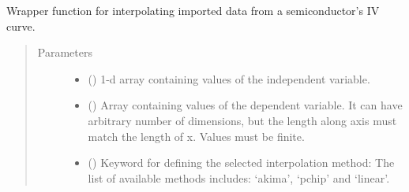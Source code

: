 \documentclass[letterpaper,10pt,english,openany, oneside]{sphinxmanual}
\begin{document}
\begin{sphinxVerbatim}[commandchars=\\\{\}]
  
 
 

 
\end{sphinxVerbatim}

\begin{fulllineitems}
\label{\detokenize{index:fompy.plots.interpol}}
Wrapper function for interpolating imported data from a semiconductor’s IV curve.
\begin{quote}\begin{description}
\item[{Parameters}] \leavevmode\begin{itemize}
\item {} 
 (\sphinxstyleliteralemphasis{\sphinxupquote{, }}\sphinxstyleliteralemphasis{\sphinxupquote{ (}}\sphinxstyleliteralemphasis{\sphinxupquote{,}}\sphinxstyleliteralemphasis{\sphinxupquote{)}}) \textendash{} 1-d array containing values of the independent variable.

\item {} 
 () \textendash{} Array containing values of the dependent variable.
It can have arbitrary number of dimensions, but the length along axis
must match the length of x. Values must be finite.

\item {} 
 () \textendash{} Keyword for defining the selected interpolation method: The list of available methods includes:
‘akima’, ‘pchip’ and ‘linear’.


\end{itemize}
\end{description}
\end{quote}
\end{fulllineitems}
\end{document}
